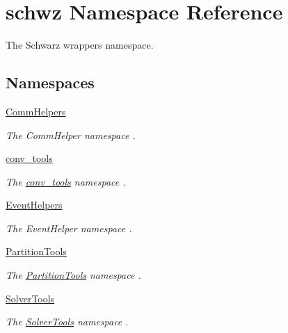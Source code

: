 \hypertarget{namespaceschwz}{}\section{schwz Namespace Reference}
\label{namespaceschwz}


The Schwarz wrappers namespace.  


\subsection*{Namespaces}
\begin{DoxyCompactItemize}
\item 
 \hyperlink{namespaceschwz_1_1CommHelpers}{Comm\+Helpers}
\begin{DoxyCompactList}\small\item\em The Comm\+Helper namespace . \end{DoxyCompactList}\item 
 \hyperlink{namespaceschwz_1_1conv__tools}{conv\+\_\+tools}
\begin{DoxyCompactList}\small\item\em The \hyperlink{namespaceschwz_1_1conv__tools}{conv\+\_\+tools} namespace . \end{DoxyCompactList}\item 
 \hyperlink{namespaceschwz_1_1EventHelpers}{Event\+Helpers}
\begin{DoxyCompactList}\small\item\em The Event\+Helper namespace . \end{DoxyCompactList}\item 
 \hyperlink{namespaceschwz_1_1PartitionTools}{Partition\+Tools}
\begin{DoxyCompactList}\small\item\em The \hyperlink{namespaceschwz_1_1PartitionTools}{Partition\+Tools} namespace . \end{DoxyCompactList}\item 
 \hyperlink{namespaceschwz_1_1SolverTools}{Solver\+Tools}
\begin{DoxyCompactList}\small\item\em The \hyperlink{namespaceschwz_1_1SolverTools}{Solver\+Tools} namespace . \end{DoxyCompactList}\end{DoxyCompactItemize}
